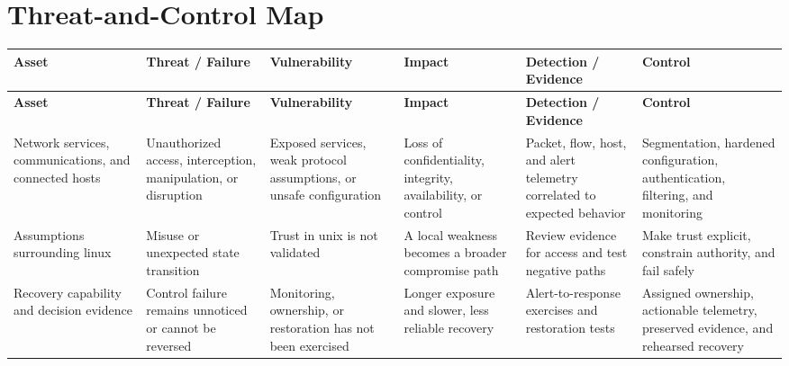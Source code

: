 \documentclass[11pt,letterpaper]{article}
\begin{document}
\section*{Threat-and-Control Map}
\begingroup\scriptsize\setlength{\tabcolsep}{2pt}
\begin{longtable}{>{\raggedright\arraybackslash}p{}>{\raggedright\arraybackslash}p{}>{\raggedright\arraybackslash}p{}>{\raggedright\arraybackslash}p{}>{\raggedright\arraybackslash}p{}>{\raggedright\arraybackslash}p{}}
\toprule\rowcolor{Navy}\color{white}\textbf{Asset} & \color{white}\textbf{Threat / Failure} & \color{white}\textbf{Vulnerability} & \color{white}\textbf{Impact} & \color{white}\textbf{Detection / Evidence} & \color{white}\textbf{Control}\\\midrule
\endfirsthead
\toprule\rowcolor{Navy}\color{white}\textbf{Asset} & \color{white}\textbf{Threat / Failure} & \color{white}\textbf{Vulnerability} & \color{white}\textbf{Impact} & \color{white}\textbf{Detection / Evidence} & \color{white}\textbf{Control}\\\midrule
\endhead
Network services, communications, and connected hosts & Unauthorized access, interception, manipulation, or disruption & Exposed services, weak protocol assumptions, or unsafe configuration & Loss of confidentiality, integrity, availability, or control & Packet, flow, host, and alert telemetry correlated to expected behavior & Segmentation, hardened configuration, authentication, filtering, and monitoring\\\midrule
Assumptions surrounding linux & Misuse or unexpected state transition & Trust in unix is not validated & A local weakness becomes a broader compromise path & Review evidence for access and test negative paths & Make trust explicit, constrain authority, and fail safely\\\midrule
Recovery capability and decision evidence & Control failure remains unnoticed or cannot be reversed & Monitoring, ownership, or restoration has not been exercised & Longer exposure and slower, less reliable recovery & Alert-to-response exercises and restoration tests & Assigned ownership, actionable telemetry, preserved evidence, and rehearsed recovery\\\midrule
\bottomrule
\end{longtable}
\endgroup
\end{document}
